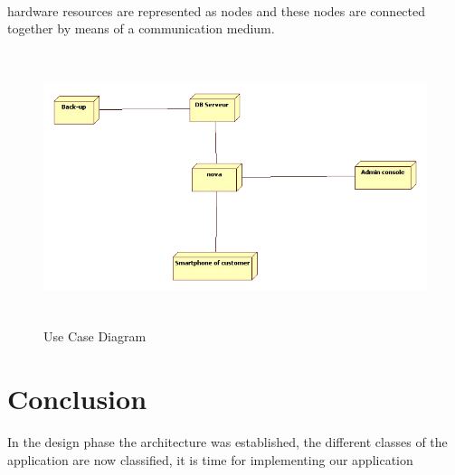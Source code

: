 \paragraph{}hardware resources are represented as nodes and these nodes are connected together by means of a communication medium.\par
\begin{figure}[!h]
 \center
 \includegraphics[width=12cm, height=8cm]{./images/design/deployment}
 \caption{Use Case Diagram}
\end{figure}

\section{Conclusion}
\paragraph{}
In the design phase the architecture was established, the different classes of the application are now classified, it is time for implementing our 
application